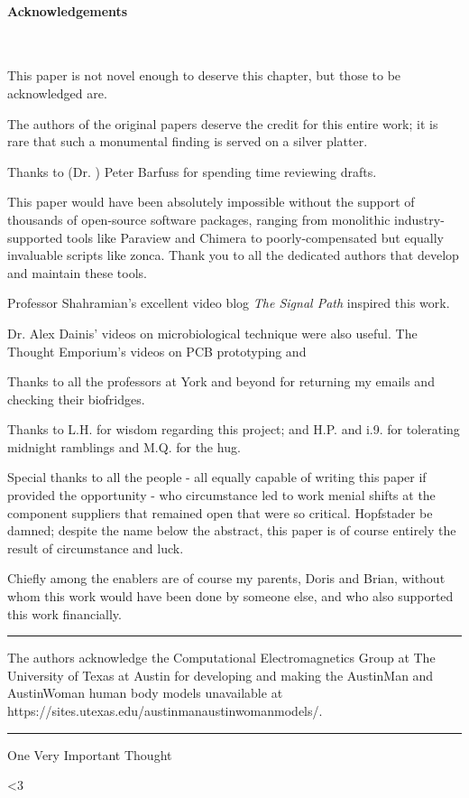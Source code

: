 \documentclass[paper.tex]{subfiles}
\begin{document}
	
\clearpage
\paragraph{Acknowledgements}\

This paper is not novel enough to deserve this chapter, but those to be acknowledged are.

The authors of the original papers deserve the credit for this entire work;  it is rare that such a monumental finding is served on a silver platter.

Thanks to (Dr. ) Peter Barfuss for spending time reviewing drafts.

This paper would have been absolutely impossible without the support of thousands of open-source software packages, ranging from monolithic industry-supported tools like Paraview and Chimera to poorly-compensated but equally invaluable scripts like zonca. Thank you to all the dedicated authors that develop and maintain these tools.

Professor Shahramian's excellent video blog {\it The Signal Path} inspired this work. 

Dr. Alex Dainis' videos on microbiological technique were also useful. The Thought Emporium's videos on PCB prototyping and 

Thanks to all the professors at York and beyond for returning my emails and checking their biofridges.

Thanks to L.H. for wisdom regarding this project; and H.P. and i.9. for tolerating midnight ramblings and M.Q. for the hug.

Special thanks to all the people - all equally capable of writing this paper if provided the opportunity - who circumstance led to work menial shifts at the component suppliers that remained open that were so critical. Hopfstader be damned; despite the name below the abstract, this paper is of course entirely the result of circumstance and luck. 

Chiefly among the enablers are of course my parents, Doris and Brian, without whom this work would have been done by someone else, and who also supported this work financially. 


\rule{\linewidth}{0.2pt}

The authors acknowledge the Computational Electromagnetics Group at The University of Texas at Austin for developing and making the AustinMan and AustinWoman human body models unavailable at https://sites.utexas.edu/austinmanaustinwomanmodels/.

\rule{\linewidth}{0.2pt}

One Very Important Thought



{\Large <3}
\end{document}
